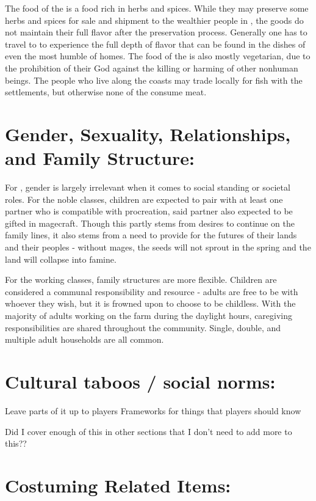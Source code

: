 \documentclass[blue]{GL2020}
\begin{document}
The food of the \pSunCh{} is a food rich in herbs and spices.  While they may preserve some herbs and spices for sale and shipment to the wealthier people in \pCreators{}, the goods do not maintain their full flavor after the preservation process.  Generally one has to travel to \pSun{} to experience the full depth of flavor that can be found in the dishes of even the most humble of homes.  The food of the \pSunCh{} is also mostly vegetarian, due to the prohibition of their God against the killing or harming of other nonhuman beings.  The people who live along the coasts may trade locally for fish with the \pVikings{} settlements, but otherwise none of the \pSunCh{} consume meat.

\section*{Gender, Sexuality, Relationships, and Family Structure:}

For \pSunCh{}, gender is largely irrelevant when it comes to social standing or societal roles.  For the noble classes, children are expected to pair with at least one partner who is compatible with procreation, said partner also expected to be gifted in magecraft.  Though this partly stems from desires to continue on the family lines, it also stems from a need to provide for the futures of their lands and their peoples - without mages, the seeds will not sprout in the spring and the land will collapse into famine.  

For the working classes, family structures are more flexible.  Children are considered a communal responsibility and resource - adults are free to be with whoever they wish, but it is frowned upon to choose to be childless.  With the majority of adults working on the farm during the daylight hours, caregiving responsibilities are shared throughout the community.  Single, double, and multiple adult households are all common.       

\section*{Cultural taboos / social norms:}

Leave parts of it up to players
Frameworks for things that players should know

Did I cover enough of this in other sections that I don't need to add more to this??

\section*{Costuming Related Items:}
\end{document}
